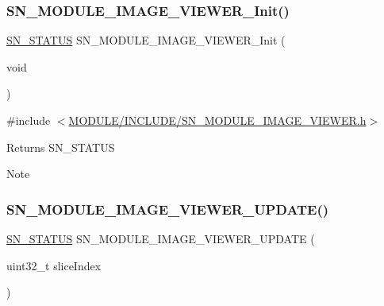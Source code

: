 \subsubsection{\texorpdfstring{S\+N\+\_\+\+M\+O\+D\+U\+L\+E\+\_\+\+I\+M\+A\+G\+E\+\_\+\+V\+I\+E\+W\+E\+R\+\_\+\+Init()}{SN\_MODULE\_IMAGE\_VIEWER\_Init()}}
{\footnotesize\ttfamily \hyperlink{group__SYSTEM__ERROR_ga4540713b9a7a18ce44d78c3a10f7442f}{S\+N\+\_\+\+S\+T\+A\+T\+US} S\+N\+\_\+\+M\+O\+D\+U\+L\+E\+\_\+\+I\+M\+A\+G\+E\+\_\+\+V\+I\+E\+W\+E\+R\+\_\+\+Init (\begin{DoxyParamCaption}\item[{void}]{ }\end{DoxyParamCaption})}



{\ttfamily \#include $<$\hyperlink{SN__MODULE__IMAGE__VIEWER_8h}{M\+O\+D\+U\+L\+E/\+I\+N\+C\+L\+U\+D\+E/\+S\+N\+\_\+\+M\+O\+D\+U\+L\+E\+\_\+\+I\+M\+A\+G\+E\+\_\+\+V\+I\+E\+W\+E\+R.\+h}$>$}

\begin{DoxyReturn}{Returns}
S\+N\+\_\+\+S\+T\+A\+T\+US 
\end{DoxyReturn}
\begin{DoxyNote}{Note}

\end{DoxyNote}
\mbox{\label{group__MODULE__IMAGE__VIEWER_ga16b58f3bf4681b8ccda18d88490456a7}} 
\subsubsection{\texorpdfstring{S\+N\+\_\+\+M\+O\+D\+U\+L\+E\+\_\+\+I\+M\+A\+G\+E\+\_\+\+V\+I\+E\+W\+E\+R\+\_\+\+U\+P\+D\+A\+T\+E()}{SN\_MODULE\_IMAGE\_VIEWER\_UPDATE()}}
{\footnotesize\ttfamily \hyperlink{group__SYSTEM__ERROR_ga4540713b9a7a18ce44d78c3a10f7442f}{S\+N\+\_\+\+S\+T\+A\+T\+US} S\+N\+\_\+\+M\+O\+D\+U\+L\+E\+\_\+\+I\+M\+A\+G\+E\+\_\+\+V\+I\+E\+W\+E\+R\+\_\+\+U\+P\+D\+A\+TE (\begin{DoxyParamCaption}\item[{uint32\+\_\+t}]{slice\+Index }\end{DoxyParamCaption})}



